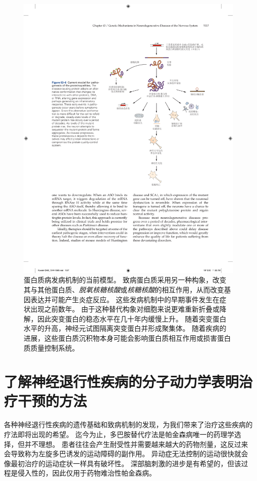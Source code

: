 \begin{figure}[htbp]
	\centering
	\includegraphics[width=0.85\linewidth]{chap63/fig_63_6}
	\caption{蛋白质病发病机制的当前模型。
		致病蛋白质采用另一种构象，改变其与其他蛋白质、\textit{脱氧核糖核酸}或\textit{核糖核酸}的相互作用，从而改变基因表达并可能产生炎症反应。
		这些发病机制中的早期事件发生在症状出现之前数年。
		由于这种替代构象对细胞来说更难重新折叠或降解，因此突变蛋白的稳态水平在几十年内缓慢上升。
		随着突变蛋白水平的升高，神经元试图隔离突变蛋白并形成聚集体。
		随着疾病的进展，这些蛋白质沉积物本身可能会影响蛋白质相互作用或损害蛋白质质量控制系统。}
	\label{fig:63_6}
\end{figure}



\section{了解神经退行性疾病的分子动力学表明治疗干预的方法}

各种神经退行性疾病的遗传基础和致病机制的发现，为我们带来了治疗这些疾病的疗法即将出现的希望。
迄今为止，多巴胺替代疗法是帕金森病唯一的药理学选择，但并不理想。
患者往往会产生耐受性并需要越来越大的药物剂量，这反过来会导致称为左旋多巴诱发的运动障碍的副作用。
异动症无法控制的运动很快就会像最初治疗的运动症状一样具有破坏性。
深部脑刺激的进步是有希望的，但该过程是侵入性的，因此仅用于药物难治性帕金森病。


